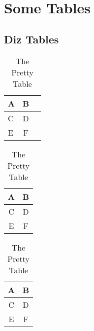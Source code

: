 \chapter{Some Tables}
\section{Diz Tables}

\begin{table}[H]
	\begin{center}
		\begin{tabular}{|l|c|r|}
			\hline
			A & B \\ 
			\hline
			C & D \\
			E & F \\
			\hline
		\end{tabular}
	\end{center}
	\caption{A Table}
	
	\begin{center}
		\begin{tabular}{cc}
			\hline
			A & B \\
			\hline
			C & D \\
			E & F \\
			\hline
		\end{tabular}
	\end{center}
	\caption{A Prettier Table}
	
	\begin{center}
		\begin{tabular}{cc}
			\toprule
			A & B \\
			\midrule
			C & D \\
			E & F \\
			\bottomrule
		\end{tabular}
	\end{center}
	\caption{The Pretty Table}
\end{table}
